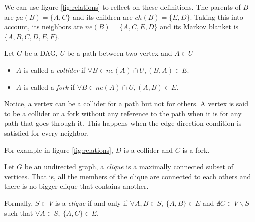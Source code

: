We can use figure \ref{fig:relations} to reflect on these definitions. The parents
of \(B\) are \(pa(B) = \{A,C\}\) and its children are \(ch(B) = \{E,D\}\). Taking this into account, its neighbors
are \(ne(B) = \{A,C,E,D\}\) and its Markov blanket is \(\{A,B,C,D,E,F\}\).

\begin{definition} Let \(G\) be a DAG, \(U\) be a path between two vertex and \(A \in U\)
  \begin{itemize}
  \item \( A \) is called a \emph{collider} if \(\forall B \in ne(A)\cap U, (B,A)\in
    E\).
  \item \( A \) is called a \emph{fork} if \(\forall B \in ne(A) \cap U, (A,B)\in
    E\).
  \end{itemize}
  Notice, a vertex can be a collider for a path but not for others. A vertex is said to be a collider or a fork without any reference to the path when it is for any path that goes through it. This happens when the edge direction condition is satisfied for every neighbor.

  For example in figure \ref{fig:relations}, \(D\) is a collider and \( C \) is
  a fork.
\end{definition}

\begin{definition}
Let \(G\) be an undirected graph, a \emph{clique} is a maximally connected
subset of vertices. That is, all the members of the clique are connected to each
others and there is no bigger clique that contains another.

Formally, \(S \subset V\) is a \emph{clique} if and only if \(\forall A,B \in S,
\ \{A,B\} \in E\) and \(\nexists C \in V\backslash S\) such that \(\forall A \in
S, \ \{A, C\} \in E \).
\end{definition}
